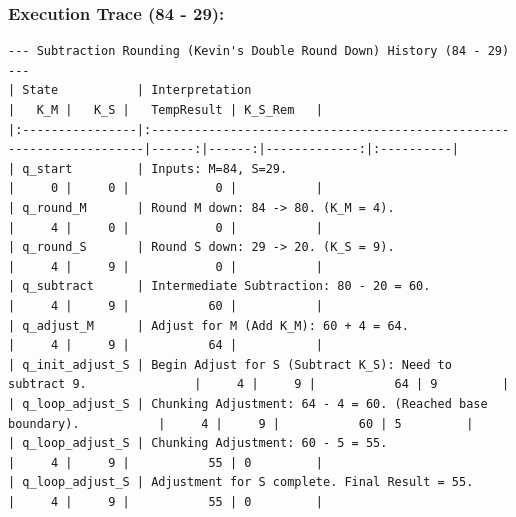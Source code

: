 \documentclass[11pt]{article}
\begin{document}
\subsubsection*{Execution Trace (84 - 29):}
\begin{verbatim}
--- Subtraction Rounding (Kevin's Double Round Down) History (84 - 29) ---
| State           | Interpretation                                                       |   K_M |   K_S |   TempResult | K_S_Rem   |
|:----------------|:---------------------------------------------------------------------|------:|------:|-------------:|:----------|
| q_start         | Inputs: M=84, S=29.                                                  |     0 |     0 |            0 |           |
| q_round_M       | Round M down: 84 -> 80. (K_M = 4).                                   |     4 |     0 |            0 |           |
| q_round_S       | Round S down: 29 -> 20. (K_S = 9).                                   |     4 |     9 |            0 |           |
| q_subtract      | Intermediate Subtraction: 80 - 20 = 60.                              |     4 |     9 |           60 |           |
| q_adjust_M      | Adjust for M (Add K_M): 60 + 4 = 64.                                 |     4 |     9 |           64 |           |
| q_init_adjust_S | Begin Adjust for S (Subtract K_S): Need to subtract 9.               |     4 |     9 |           64 | 9         |
| q_loop_adjust_S | Chunking Adjustment: 64 - 4 = 60. (Reached base boundary).           |     4 |     9 |           60 | 5         |
| q_loop_adjust_S | Chunking Adjustment: 60 - 5 = 55.                                    |     4 |     9 |           55 | 0         |
| q_loop_adjust_S | Adjustment for S complete. Final Result = 55.                        |     4 |     9 |           55 | 0         |
\end{verbatim}
\end{document}
